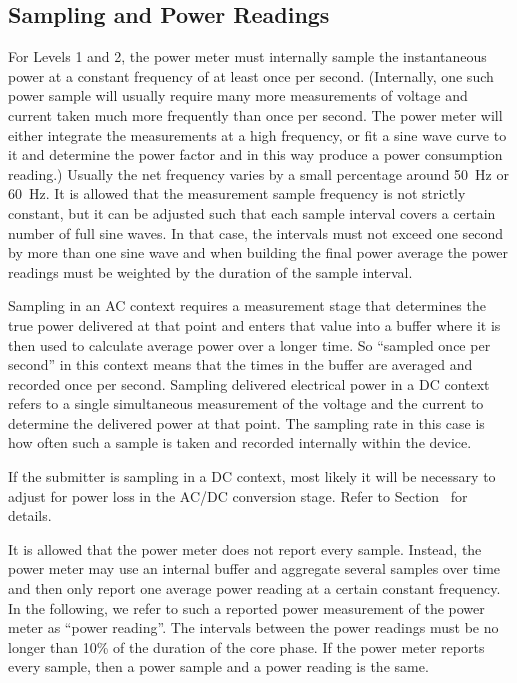\subsection{Sampling and Power Readings}
\noindent
For Levels 1 and 2, the power meter must internally sample the instantaneous power at a constant frequency of at least once per second.
(Internally, one such power sample will usually require many more measurements of voltage and current taken much more frequently than once per second.
The power meter will either integrate the measurements at a high frequency, or fit a sine wave curve to it and determine the power factor and in this way produce a power consumption reading.)
Usually the net frequency varies by a small percentage around 50~Hz or 60~Hz.
It is allowed that the measurement sample frequency is not strictly constant, but it can be adjusted such that each sample interval covers a certain number of full sine waves.
In that case, the intervals must not exceed one second by more than one sine wave and when building the final power average the power readings must be weighted by the duration of the sample interval.
\wl

\noindent
Sampling in an AC context requires a measurement stage that determines the true power delivered at that point and enters that value into a buffer where it is then used to calculate average power over a longer time.
So ``sampled once per second'' in this context means that the times in the buffer are averaged and recorded once per second.
Sampling delivered electrical power in a DC context refers to a single simultaneous measurement of the voltage and the current to determine the delivered power at that point.
The sampling rate in this case is how often such a sample is taken and recorded internally within the device.
\wl

\noindent
If the submitter is sampling in a DC context, most likely it will be necessary to adjust for power loss in the AC/DC conversion stage.
Refer to Section~ for details.
\wl

\noindent
It is allowed that the power meter does not report every sample.
Instead, the power meter may use an internal buffer and aggregate several samples over time and then only report one average power reading at a certain constant frequency.
In the following, we refer to such a reported power measurement of the power meter as ``power reading''.
The intervals between the power readings must be no longer than 10\% of the duration of the core phase.
If the power meter reports every sample, then a power sample and a power reading is the same.
\wl

